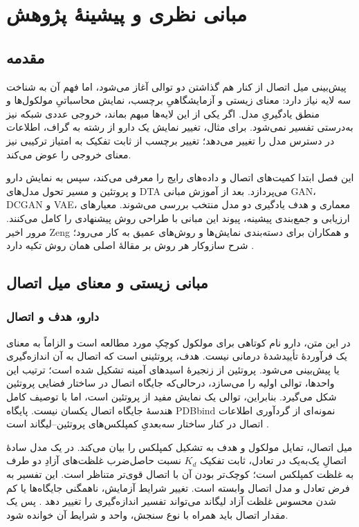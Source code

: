 \chapter{مبانی نظری و پیشینهٔ پژوهش}
\label{ch:mabani}

\section{مقدمه}
\label{sec:intro-ch2}
پیش‌بینی میل اتصال از کنار هم گذاشتن دو توالی آغاز می‌شود، اما فهم آن به شناخت سه لایه نیاز دارد: معنای زیستی و آزمایشگاهیِ برچسب، نمایش محاسباتیِ مولکول‌ها و منطق یادگیریِ مدل. اگر یکی از این لایه‌ها مبهم بماند، خروجی عددی شبکه نیز به‌درستی تفسیر نمی‌شود. برای مثال، تغییر نمایش یک دارو از رشته به گراف، اطلاعات در دسترس مدل را تغییر می‌دهد؛ تغییر برچسب از ثابت تفکیک به امتیاز ترکیبی نیز معنای خروجی را عوض می‌کند.

این فصل ابتدا کمیت‌های اتصال و داده‌های رایج را معرفی می‌کند، سپس به نمایش دارو و پروتئین و مسیر تحول مدل‌های DTA می‌پردازد. بعد از آموزش مبانی GAN، DCGAN و VAE، معماری و هدف یادگیری دو مدل منتخب بررسی می‌شوند. معیارهای ارزیابی و جمع‌بندی پیشینه، پیوند این مبانی با طراحی روش پیشنهادی را کامل می‌کنند. مرور اخیر Zeng و همکاران برای دسته‌بندی نمایش‌ها و روش‌های عمیق به کار می‌رود؛ شرح سازوکار هر روش بر مقالهٔ اصلی همان روش تکیه دارد \cite{Zeng24DTAReview}.

\section{مبانی زیستی و معنای میل اتصال}
\label{sec:binding-quantities}
\subsection{دارو، هدف و اتصال}
در این متن، دارو نام کوتاهی برای مولکول کوچکِ مورد مطالعه است و الزاماً به معنای یک فرآوردهٔ تأییدشدهٔ درمانی نیست. هدف، پروتئینی است که اتصال به آن اندازه‌گیری یا پیش‌بینی می‌شود. پروتئین از زنجیرهٔ اسیدهای آمینه تشکیل شده است؛ ترتیب این واحدها، توالی اولیه را می‌سازد، درحالی‌که جایگاه اتصال در ساختار فضایی پروتئین شکل می‌گیرد. بنابراین، توالی یک نمایش مفید از پروتئین است، اما با توصیف کامل هندسهٔ جایگاه اتصال یکسان نیست. پایگاه PDBbind نمونه‌ای از گردآوری اطلاعات اتصال در کنار ساختار سه‌بعدیِ کمپلکس‌های پروتئین--لیگاند است \cite{Wang04PDBbind}.

میل اتصال، تمایل مولکول و هدف به تشکیل کمپلکس را بیان می‌کند. در یک مدل سادهٔ اتصالِ یک‌به‌یک در تعادل، ثابت تفکیک $K_d$ نسبت حاصل‌ضرب غلظت‌های آزادِ دو طرف به غلظت کمپلکس است؛ کوچک‌تر بودن آن با اتصال قوی‌تر متناظر است. این تفسیر به فرض تعادل و مدل اتصال وابسته است. تغییر شرایط آزمایش، ناهمگنی جایگاه‌ها یا کم شدن محسوس غلظت آزاد لیگاند می‌تواند تفسیر اندازه‌گیری را تغییر دهد \cite{Hulme10BindingAssays}. پس یک مقدار اتصال باید همراه با نوع سنجش، واحد و شرایط آن خوانده شود.

